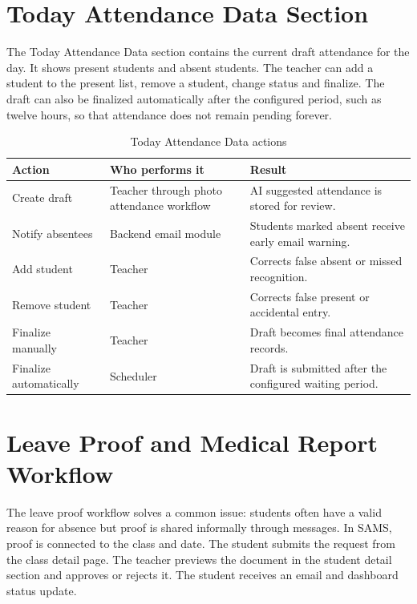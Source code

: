 \section{Today Attendance Data Section}

The Today Attendance Data section contains the current draft attendance for the day. It shows present students and absent students. The teacher can add a student to the present list, remove a student, change status and finalize. The draft can also be finalized automatically after the configured period, such as twelve hours, so that attendance does not remain pending forever.

\begin{table}[H]
\centering
\caption{Today Attendance Data actions}
\label{tab:today-actions}
\begin{tabularx}{\textwidth}{p{3.3cm} X X}
\toprule
\textbf{Action} & \textbf{Who performs it} & \textbf{Result}\\
\midrule
Create draft & Teacher through photo attendance workflow & AI suggested attendance is stored for review.\\
Notify absentees & Backend email module & Students marked absent receive early email warning.\\
Add student & Teacher & Corrects false absent or missed recognition.\\
Remove student & Teacher & Corrects false present or accidental entry.\\
Finalize manually & Teacher & Draft becomes final attendance records.\\
Finalize automatically & Scheduler & Draft is submitted after the configured waiting period.\\
\bottomrule
\end{tabularx}
\end{table}

\section{Leave Proof and Medical Report Workflow}

The leave proof workflow solves a common issue: students often have a valid reason for absence but proof is shared informally through messages. In SAMS, proof is connected to the class and date. The student submits the request from the class detail page. The teacher previews the document in the student detail section and approves or rejects it. The student receives an email and dashboard status update.

